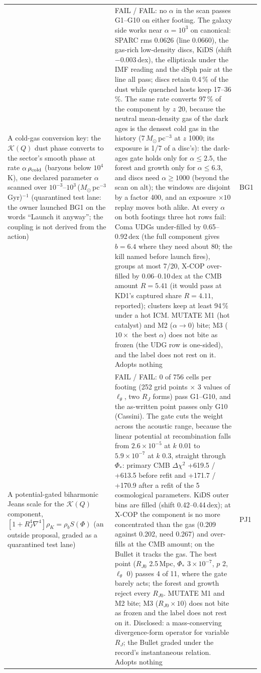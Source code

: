 \documentclass[10pt]{article}
\begin{document}
\begin{longtable}{@{}p{4.4cm}p{8.6cm}p{2.8cm}@{}}
A cold-gas conversion key: the $\mathcal K(Q)$ dust phase converts to the sector's smooth phase at rate $\alpha\,\rho_{\rm cold}$ (baryons below $10^4$\,K), one declared parameter $\alpha$ scanned over $10^{-3}$--$10^{3}$\,($M_\odot$\,pc$^{-3}$\,Gyr)$^{-1}$ (quarantined test lane: the owner launched BG1 on the words ``Launch it anyway''; the coupling is not derived from the action) & FAIL / FAIL: no $\alpha$ in the scan passes G1--G10 on either footing. The galaxy side works near $\alpha=10^3$ on canonical: SPARC rms 0.0626 (line 0.0660), the gas-rich low-density discs, KiDS (shift $-0.003$\,dex), the ellipticals under the IMF reading and the dSph pair at the line all pass; discs retain 0.4\,\% of the dust while quenched hosts keep 17--36\,\%. The same rate converts 97\,\% of the component by $z$ 20, because the neutral mean-density gas of the dark ages is the densest cold gas in the history (7\,$M_\odot$\,pc$^{-3}$ at $z$ 1000; its exposure is 1/7 of a disc's): the dark-ages gate holds only for $\alpha\le2.5$, the forest and growth only for $\alpha\le6.3$, and discs need $\alpha\ge1000$ (beyond the scan on alt); the windows are disjoint by a factor 400, and an exposure $\times10$ replay moves both alike. At every $\alpha$ on both footings three hot rows fail: Coma UDGs under-filled by 0.65--0.92\,dex (the full component gives $b=6.4$ where they need about 80; the kill named before launch fires), groups at most 7/20, X-COP over-filled by 0.06--0.10\,dex at the CMB amount $R=5.41$ (it would pass at KD1's captured share $R=4.11$, reported); clusters keep at least 94\,\% under a hot ICM. MUTATE M1 (hot catalyst) and M2 ($\alpha\to0$) bite; M3 ($10\times$ the best $\alpha$) does not bite as frozen (the UDG row is one-sided), and the label does not rest on it. Adopts nothing & BG1\\
A potential-gated biharmonic Jeans scale for the $\mathcal K(Q)$ component, $[1+R_J^4\nabla^4]\rho_K=\rho_b S(\Phi)$ (an outside proposal, graded as a quarantined test lane) & FAIL / FAIL: 0 of 756 cells per footing (252 grid points $\times$ 3 values of $\ell_\theta$, two $R_J$ forms) pass G1--G10, and the as-written point passes only G10 (Cassini). The gate cuts the weight across the acoustic range, because the linear potential at recombination falls from $2.6\times10^{-5}$ at $k$ 0.01 to $5.9\times10^{-7}$ at $k$ 0.3, straight through $\Phi_*$: primary CMB $\Delta\chi^2$ +619.5 / +613.5 before refit and +171.7 / +170.9 after a refit of the 5 cosmological parameters. KiDS outer bins are filled (shift 0.42--0.44\,dex); at X-COP the component is no more concentrated than the gas (0.209 against 0.202, need 0.267) and over-fills at the CMB amount; on the Bullet it tracks the gas. The best point ($R_{J0}$ 2.5\,Mpc, $\Phi_*$ $3\times10^{-7}$, $p$ 2, $\ell_\theta$ 0) passes 4 of 11, where the gate barely acts; the forest and growth reject every $R_{J0}$. MUTATE M1 and M2 bite; M3 ($R_{J0}\times10$) does not bite as frozen and the label does not rest on it. Disclosed: a mass-conserving divergence-form operator for variable $R_J$; the Bullet graded under the record's instantaneous relation. Adopts nothing & PJ1\\

\end{longtable}
\end{document}
